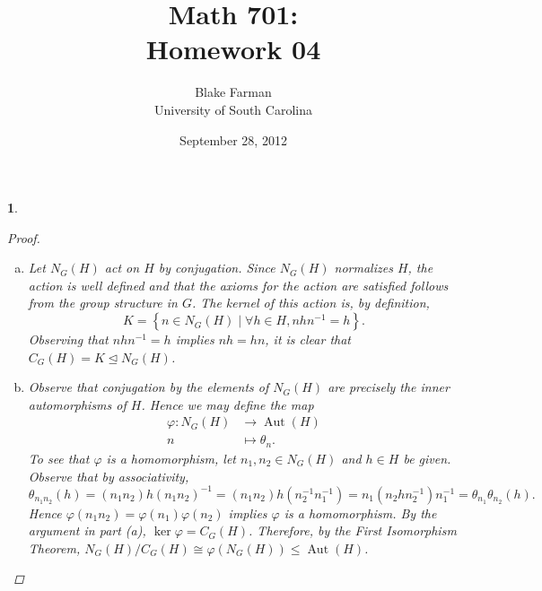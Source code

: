 \documentclass[10pt]{amsart}
\author{Blake Farman\\University of South Carolina}
\title{Math 701:\\Homework 04}
\date{September 28, 2012}
\begin{document}
\maketitle

\newcommand{\Inn}[1]{\operatorname{Inn}\left(#1\right)}
\newcommand{\Aut}[1]{\operatorname{Aut}\left(#1\right)}
\newcommand{\cntr}[1]{\mathbf{Z}\left(#1\right)}
\newcommand{\abs}[1]{\left| #1 \right|}
\newcommand{\SL}[2]{\operatorname{SL}_#1\left(#2\right)}
\newcommand{\Mat}[2]{\operatorname{Mat}_{#1}\left(#2\right)}
\newcommand{\orbit}[1]{\mathcal{O}_{#1}}
\newcommand{\real}[1]{\operatorname{\mathfrak{Re}}\left(#1\right)}
\newcommand{\imag}[1]{\operatorname{\mathfrak{Im}}\left(#1\right)}
\renewcommand{\qedsymbol}{\ensuremath{\blacksquare}}

\newtheorem{thm}{}
\newtheorem{lem}{Lemma}

\begin{thm}
  \begin{proof}
    \begin{enumerate}[(a)]
      \item
        Let $N_G(H)$ act on $H$ by conjugation.
        Since $N_G(H)$ normalizes $H$, the action is well defined and that the axioms for the action are satisfied follows from the group structure in $G$.
        The kernel of this action is, by definition, 
        $$K = \left\{n \in N_G(H) \mid \forall h \in H, nhn^{-1} = h\right\}.$$ 
        Observing that $nhn^{-1} = h$ implies $nh = hn$, it is clear that $C_G(H) = K \unlhd N_G(H)$.
      \item
        Observe that conjugation by the elements of $N_G(H)$ are precisely the inner automorphisms of $H$.
        Hence we may define the map
        \begin{align*}
          \varphi \colon N_G(H) &\rightarrow \Aut{H}\\
          n &\mapsto \theta_n.
        \end{align*}
        To see that $\varphi$ is a homomorphism, let $n_1,n_2 \in N_G(H)$ and $h \in H$ be given.
        Observe that by associativity, $$\theta_{n_1n_2}(h) = (n_1n_2)h(n_1n_2)^{-1} = (n_1n_2) h (n_2^{-1}n_1^{-1}) = n_1(n_2 h n_2^{-1})n_1^{-1} = \theta_{n_1}\theta_{n_2}(h).$$
        Hence $\varphi(n_1n_2) = \varphi(n_1)\varphi(n_2)$ implies $\varphi$ is a homomorphism.
        By the argument in part (a), $\ker\varphi = C_G(H)$.
        Therefore, by the First Isomorphism Theorem, $N_G(H)/C_G(H) \cong \varphi(N_G(H)) \leq \Aut{H}$.
    \end{enumerate}
  \end{proof}
\end{thm}
\end{document}
